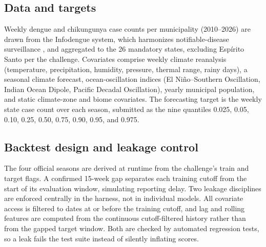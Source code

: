 \documentclass[11pt]{article}
\begin{document}
\subsection{Data and targets}\label{sec:methods-data}
Weekly dengue and chikungunya case counts per municipality (2010--2026) are drawn from the Infodengue
system, which harmonizes notifiable-disease surveillance \citep{codeco2018}, and aggregated to the 26
mandatory states, excluding Espírito Santo per the challenge. Covariates comprise weekly climate
reanalysis (temperature, precipitation, humidity, pressure, thermal range, rainy days), a seasonal
climate forecast, ocean-oscillation indices (El Ni\~no--Southern Oscillation, Indian Ocean Dipole,
Pacific Decadal Oscillation), yearly municipal population, and static climate-zone and biome
covariates. The forecasting target is the weekly state case count over each season, submitted as the
nine quantiles 0.025, 0.05, 0.10, 0.25, 0.50, 0.75, 0.90, 0.95, and 0.975.

\subsection{Backtest design and leakage control}\label{sec:methods-backtest}
The four official seasons are derived at runtime from the challenge's train and target flags. A
confirmed 15-week gap separates each training cutoff from the start of its evaluation window,
simulating reporting delay. Two leakage disciplines are enforced centrally in the harness, not in
individual models. All covariate access is filtered to dates at or before the training cutoff, and
lag and rolling features are computed from the continuous cutoff-filtered history rather than from the
gapped target window. Both are checked by automated regression tests, so a leak fails the test suite
instead of silently inflating scores.
\end{document}
